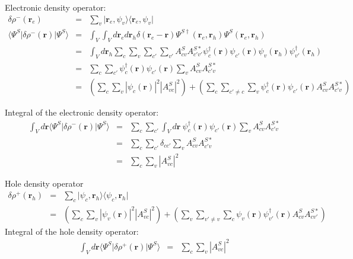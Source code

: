 \documentclass[book]{revtex4}
\begin{document}
Electronic density operator:
\begin{eqnarray}
\delta \rho^-  \left(  \mathbf{r}_e\right)  &=&  \sum_{v}     \vert    \mathbf{r}_e,  \psi_v   \rangle   \langle   \mathbf{r}_e,  \psi_v \vert  \\
 \langle \Psi^S  \vert \delta \rho^-  \left(  \mathbf{r}\right)    \vert \Psi^S \rangle &=&  \int_V\int_{V} d  \mathbf{r}_e  d\mathbf{r}_h    \delta \left(  \mathbf{r}_e - \mathbf{r} \right)   \Psi^{S\dagger} \left(  \mathbf{r}_e, \mathbf{r}_h \right)  \Psi^S \left(  \mathbf{r}_e, \mathbf{r}_h \right) \\
&=&  \int_V d\mathbf{r}_h    \sum_c \sum_v \sum_{c'} \sum_{v'}  A^S_{cv} A^{S*}_{c'v'} \psi^\dagger_c  \left(    \mathbf{r} \right) \psi_{c'}  \left(    \mathbf{r} \right)  \psi_v  \left(    \mathbf{r}_h \right) \psi^\dagger_{v'}  \left(    \mathbf{r}_h \right) \\
&=&  \sum_c \sum_{c'} \psi^\dagger_c  \left(    \mathbf{r} \right) \psi_{c'}  \left(    \mathbf{r} \right)  \sum_v   A^S_{cv} A^{S*}_{c'v} \\
&=&   \left( \sum_c \sum_v  \left| \psi_c  \left(    \mathbf{r} \right)\right|^2 \left| A^{S}_{vc} \right|^2  \right)  + \left(   \sum_c \sum_{c'\neq c} \sum_v   \psi^\dagger_c  \left(    \mathbf{r} \right) \psi_{c'}  \left(    \mathbf{r} \right)  A^S_{cv} A^{S*}_{c'v}  \right) 
\end{eqnarray}

Integral of the electronic density operator:
\begin{eqnarray}
 \int_V d \mathbf{r} \langle \Psi^S  \vert \delta \rho^-  \left(  \mathbf{r}\right)    \vert \Psi^S \rangle&=& \sum_c \sum_{c'} \int_V  d\mathbf{r}\ \psi^\dagger_c  \left(    \mathbf{r} \right) \psi_{c'}  \left(    \mathbf{r} \right)  \sum_v   A^S_{cv} A^{S*}_{c'v}  \\
 &=& \sum_c \sum_{c'} \delta_{cc'}  \sum_v   A^S_{cv} A^{S*}_{c'v}  \\
 &=& \sum_c \sum_v \left| A^{S}_{vc} \right|^2
\end{eqnarray}

Hole density operator
\begin{eqnarray}
\delta \rho^+  \left(  \mathbf{r}_h\right)  &=&  \sum_{c}     \vert   \psi_c ,    \mathbf{r}_h  \rangle   \langle  \psi_c,  \mathbf{r}_h \vert  \\
 &=&   \left( \sum_c \sum_v  \left| \psi_v  \left(    \mathbf{r} \right)\right|^2 \left| A^{S}_{vc} \right|^2  \right)  + \left(   \sum_v \sum_{v'\neq v} \sum_c   \psi_v  \left(    \mathbf{r} \right) \psi^\dagger_{v'}  \left(    \mathbf{r} \right)  A^S_{cv} A^{S*}_{cv'}  \right)  
\end{eqnarray}
Integral of the hole density operator:
\begin{eqnarray}
 \int_V d \mathbf{r} \langle \Psi^S  \vert \delta \rho^+  \left(  \mathbf{r}\right)    \vert \Psi^S \rangle  &=& \sum_c \sum_v \left| A^{S}_{vc} \right|^2
\end{eqnarray}
\end{document}

